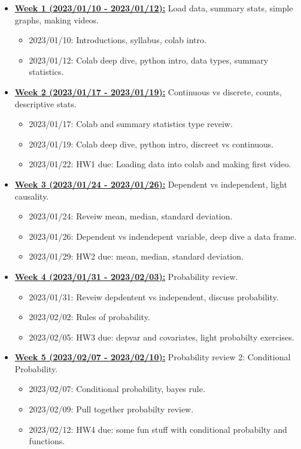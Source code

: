 \documentclass[11pt]{article}
\begin{document}
\begin{itemize}
  \item \underline{\textbf{Week 1 (2023/01/10 - 2023/01/12):}} Load data, summary stats, simple graphs, making videos.
  \begin{itemize}
    \item 2023/01/10: Introductions, syllabus, colab intro.
    \item 2023/01/12: Colab deep dive, python intro, data types, summary statistics.
  \end{itemize}
  
  \item \underline{\textbf{Week 2 (2023/01/17 - 2023/01/19):}} Continuous vs discrete, counts, descriptive stats.
  \begin{itemize}
    \item 2023/01/17: Colab and summary statistics type reveiw. 
    \item 2023/01/19: Colab deep dive, python intro, discreet vs continuous.
    \item 2023/01/22: HW1 due: Loading data into colab and making first video.
  \end{itemize}

  \item \underline{\textbf{Week 3 (2023/01/24 - 2023/01/26):}} Dependent vs independent, light causality. 
  \begin{itemize}
    \item 2023/01/24: Reveiw mean, median, standard deviation. 
    \item 2023/01/26: Dependent vs indendepent variable, deep dive a data frame. 
    \item 2023/01/29: HW2 due: mean, median, standard deviation.
  \end{itemize}


  \item \underline{\textbf{Week 4 (2023/01/31 - 2023/02/03):}} Probability review. 
  \begin{itemize}
    \item 2023/01/31: Reveiw depdentent vs independent, discuss probability. 
    \item 2023/02/02: Rules of probability. 
    \item 2023/02/05: HW3 due: depvar and covariates, light probabilty exercises.
  \end{itemize}

  \item \underline{\textbf{Week 5 (2023/02/07 - 2023/02/10):}} Probability review 2: Conditional Probability.
  \begin{itemize}
    \item 2023/02/07: Conditional probability, bayes rule.
    \item 2023/02/09: Pull together probabilty review. 
    \item 2023/02/12: HW4 due: some fun stuff with conditional probabilty and functions.


\end{itemize}
\end{itemize}
\end{document}
